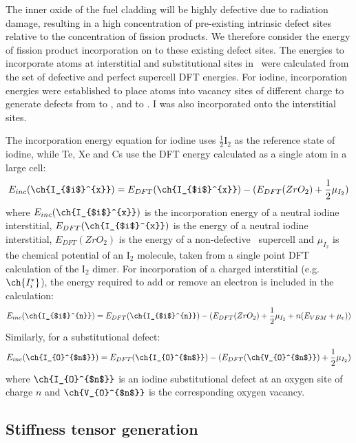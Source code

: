 The inner oxide of the fuel cladding will be highly defective due to radiation damage, resulting in a high concentration of pre-existing intrinsic defect sites relative to the concentration of fission products. We therefore consider the energy of fission product incorporation on to these existing defect sites. The energies to incorporate atoms at interstitial and substitutional sites in \zirconia\ were calculated from the set of defective and perfect supercell DFT energies. For iodine, incorporation energies were established to place atoms into vacancy sites of different charge to generate defects from  to , and  to . I was also incorporated onto the interstitial sites.

The incorporation energy equation for iodine uses $\frac{1}{2}$I$_{2}$ as the reference state of iodine, while Te, Xe and Cs use the DFT energy calculated as a single atom in a large cell:
\begin{equation}
\label{interstitial_incorp_equation}
E_{inc}(\ch{I_{$i$}^{x}}) = E_{DFT}(\ch{I_{$i$}^{x}}) - (E_{DFT}(ZrO_2) + \frac{1}{2}\mu_{I_{2}})  %
\end{equation}
where $E_{inc}(\ch{I_{$i$}^{x}})$ is the incorporation energy of a neutral iodine interstitial, $E_{DFT}(\ch{I_{$i$}^{x}})$ is the energy of a neutral iodine interstitial, $E_{DFT}(ZrO_2)$ is the energy of a non-defective \zirconia\ supercell and $\mu_{I_{2}}$ is the chemical potential of an I$_{2}$ molecule, taken from a single point DFT calculation of the I$_{2}$ dimer. For incorporation of a charged interstitial (e.g. $\ch{I_{i}^{*}}$), the energy required to add or remove an electron is included in the calculation:
\begin{equation}
\label{interstitial_incorp_equation_charged}
E_{inc}(\ch{I_{$i$}^{n}}) = E_{DFT}(\ch{I_{$i$}^{n}}) - (E_{DFT}(ZrO_2) + \frac{1}{2}\mu_{I_{2}} + n(E_{VBM} + \mu_{e}))
\end{equation}
Similarly, for a substitutional defect:
\begin{equation}
\label{o_sub_incorp_equation}
E_{inc}(\ch{I_{O}^{$n$}}) = E_{DFT}(\ch{I_{O}^{$n$}}) - (E_{DFT}(\ch{V_{O}^{$n$}}) + \frac{1}{2}\mu_{I_{2}})  %
\end{equation}
where $\ch{I_{O}^{$n$}}$ is an iodine substitutional defect at an oxygen site of charge $n$ and $\ch{V_{O}^{$n$}}$ is the corresponding oxygen vacancy.

\subsection{Stiffness tensor generation}


